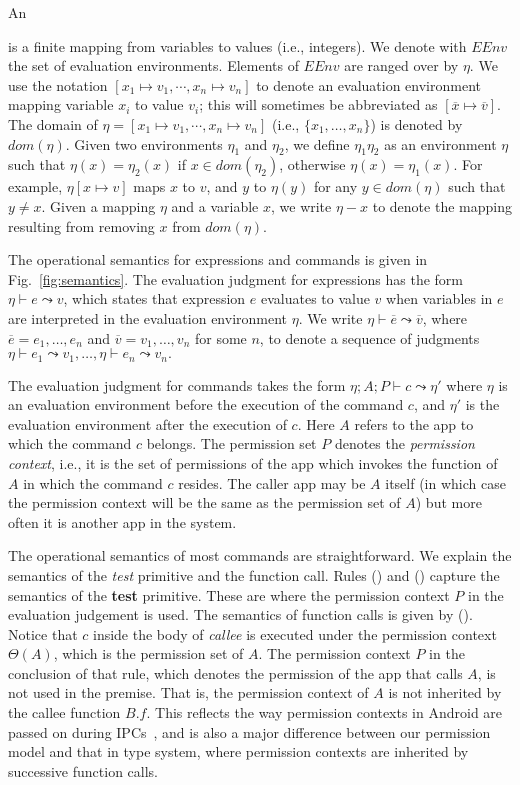 An {
is a finite mapping from variables to values (i.e., integers).
We denote with $EEnv$ the set of evaluation environments.
Elements of $EEnv$ are ranged over by $\eta$.
We  use the notation
$[ x_1 \mapsto v_1, \cdots,  x_n \mapsto v_n]$
to denote an evaluation environment mapping variable $x_i$ to value $v_i$; this will sometimes be abbreviated as $[ \overline x \mapsto \overline v ].$
The domain of $\eta = [ x_1 \mapsto v_1, \cdots, x_n \mapsto v_n]$ (i.e., $\{x_1,\dots,x_n\}$) is denoted by $dom(\eta)$.
Given two environments $\eta_1$ and $\eta_2$, we define
$\eta_1\eta_2$ as an environment $\eta$ such that $\eta(x) = \eta_2(x)$ if $x \in dom(\eta_2)$,
otherwise $\eta(x) =\eta_1(x)$.
For example, $\eta[x \mapsto v]$ maps $x$ to $v$, and $y$ to $\eta(y)$
for any $y \in dom(\eta)$ such that $y \not = x.$
Given a mapping $\eta$ and a variable $x$, we write $\eta\!-\!x$ to denote the
mapping resulting from removing $x$ from $dom(\eta)$.

The operational semantics for expressions and commands is
given in Fig.~\ref{fig:semantics}.
The evaluation judgment
for expressions has the form $\eta\vdash e\leadsto v$,
which states that expression $e$ evaluates to value $v$ when variables
in $e$ are interpreted in the evaluation environment $\eta.$
We write $\eta \vdash \overline{e} \leadsto \overline{v}$,
where $\overline{e}=e_1,\dots,e_n$ and $\overline{v} = v_1,\dots,v_n$ for some $n$,
to denote a sequence of judgments
$\eta \vdash e_1 \leadsto v_1, \ldots, \eta \vdash e_n \leadsto v_n.$

The evaluation judgment for commands takes the form
$\eta;A;P\vdash c \leadsto \eta'$
where $\eta$ is an evaluation environment before the execution
of the command $c$, and $\eta'$ is the evaluation environment
after the execution of $c$. Here $A$ refers to the app to which the command $c$ belongs.
The permission set $P$ denotes the {\em permission context}, i.e., it is the set of permissions of the app which invokes the function of $A$ in which the command $c$ resides. The caller
app may be $A$ itself (in which case the permission context will be the same as the permission set of $A$) but more often it is another app in the system.

The operational semantics of most commands are straightforward.
We explain the semantics of the \emph{test} primitive and the function call.
Rules () and () capture the semantics of the \textbf{test} primitive.
These are where the permission context $P$ in the evaluation judgement is used.
The semantics of function calls is given by (). 
 Notice that $c$ inside the body of \emph{callee} is executed under
the permission context $\Theta(A)$, which is the permission set of $A$. The permission context $P$
in the conclusion of that rule, which denotes the permission of the app that calls $A$, 
is not used in the premise. That is, the permission context of $A$ is not inherited by 
the callee function $B.f$. This reflects the way permission contexts in Android
are passed on during IPCs~\cite{Android-CheckPerm,Android-Binder-IPC}, and is also a major difference
between our permission model and that in {\BN} type system,
where permission contexts are inherited by successive function calls.

}
